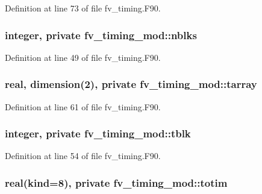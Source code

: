 Definition at line 73 of file fv\-\_\-timing.\-F90.

\subsubsection[{nblks}]{\setlength{\rightskip}{0pt plus 5cm}integer, private fv\-\_\-timing\-\_\-mod\-::nblks\hspace{0.3cm}{\ttfamily [private]}}\label{classfv__timing__mod_a8f78bb855cc4e52f3308ab25fa4498a5}


Definition at line 49 of file fv\-\_\-timing.\-F90.

\subsubsection[{tarray}]{\setlength{\rightskip}{0pt plus 5cm}real, dimension(2), private fv\-\_\-timing\-\_\-mod\-::tarray\hspace{0.3cm}{\ttfamily [private]}}\label{classfv__timing__mod_a18b8ce2f3249b1cfb378a40c048b615b}


Definition at line 61 of file fv\-\_\-timing.\-F90.

\subsubsection[{tblk}]{\setlength{\rightskip}{0pt plus 5cm}integer, private fv\-\_\-timing\-\_\-mod\-::tblk\hspace{0.3cm}{\ttfamily [private]}}\label{classfv__timing__mod_aaeddb0efd1e02edd882b6f325ad57047}


Definition at line 54 of file fv\-\_\-timing.\-F90.

\subsubsection[{totim}]{\setlength{\rightskip}{0pt plus 5cm}real(kind=8), private fv\-\_\-timing\-\_\-mod\-::totim\hspace{0.3cm}{\ttfamily [private]}}\label{classfv__timing__mod_a5460a631553f37f69e3f87d4725fdb83}


